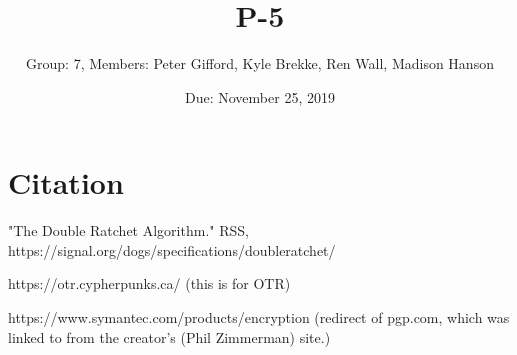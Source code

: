 \documentclass{article}
\title{P-5}
\author{Group: 7, Members: Peter Gifford, Kyle Brekke, Ren Wall, Madison Hanson}
\date{Due: November 25, 2019}
\begin{document}
\maketitle



\section{Citation}

"The Double Ratchet Algorithm." RSS, https://signal.org/dogs/specifications/doubleratchet/

https://otr.cypherpunks.ca/ (this is for OTR)
    
https://www.symantec.com/products/encryption (redirect of pgp.com, which was linked to from the creator's (Phil Zimmerman) site.)	
	    
\end{document}
